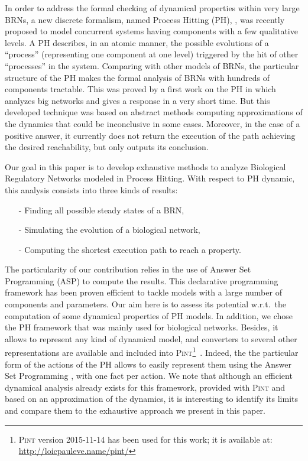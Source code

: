 In order to address the formal checking of dynamical properties within very large BRNs, a new discrete formalism, named Process Hitting (PH), \cite{PMR10-TCSB}, was recently proposed to model concurrent systems having components with a few qualitative levels. A PH describes, in an atomic manner, the possible evolutions of a ``process'' (representing one component at one level) triggered by the hit of other ``processes'' in the system. Comparing with other models of BRNs, the particular structure of the PH makes the formal analysis of BRNs with hundreds of components tractable. This was proved by a first work on the PH in \cite{PMR12-MSCS} which analyzes big networks and gives a response in a very short time. But this developed technique was based on abstract methods computing approximations of the dynamics that could be inconclusive in some cases. Moreover, in the case of a positive answer, it currently does not return the execution of the path achieving the desired reachability, but only outputs its conclusion.

Our goal in this paper is to develop exhaustive methods to analyze Biological Regulatory Networks modeled in Process Hitting. With respect to PH dynamic, this analysis consists into three kinds of results:
\begin{itemize}
\item[-] Finding all possible steady states of a BRN,
\item[-] Simulating the evolution of a biological network,
\item[-] Computing the shortest execution path to reach a property.
\end{itemize}

 The particularity of our contribution relies in the use of Answer Set Programming
(ASP) \cite{baral2003knowledge}
to compute the results.
This declarative programming framework has been proven efficient
to tackle models with a large number of components and parameters.
Our aim here is to assess its potential w.r.t.\ the computation
of some dynamical properties of PH models. In addition, we chose the PH framework that was mainly used for biological networks. Besides, it allows to represent any kind of dynamical model,
and converters to several other representations are available and included into \textsc{Pint}\footnote{\textsc{Pint} version 2015-11-14 has been used for this work; it is available at: \url{http://loicpauleve.name/pint/}}~\cite{PMR12-MSCS}.
Indeed, the the particular form of the actions of the PH allows
to easily represent them using the Answer Set Programming \cite{Baral03, Vladimir, Glimpse, sureshkumar2006ansprolog},
with one fact per action.
We note that although an efficient dynamical analysis already exists for this framework,
provided with \textsc{Pint} and based on an approximation of the dynamics,
it is interesting to identify its limits
and compare them to the exhaustive approach we present in this paper.